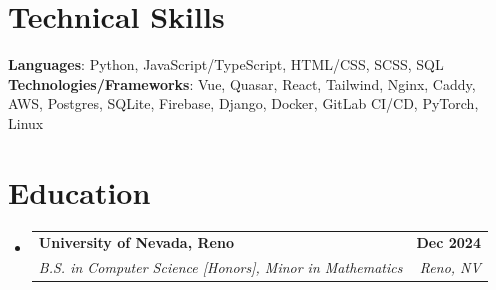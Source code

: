 \documentclass[letterpaper,11pt]{article}
\makeatletter
\newcommand{\resumeSubheading}[4]{
  \vspace{-2pt}\item
    \begin{tabular*}{1.0\textwidth}[t]{l@{\extracolsep{\fill}}r}
      \textbf{#1} & \textbf{\small #2} \\
      \textit{\small#3} & \textit{\small #4} \\
    \end{tabular*}\vspace{-7pt}
}
\newcommand{\resumeSubHeadingListStart}{\begin{itemize}[leftmargin=0.0in, label={}]}
\newcommand{\resumeSubHeadingListEnd}{\end{itemize}}
\makeatother
\begin{document}
%
\section{Technical Skills}
 \begin{itemize}[leftmargin=0.15in, label={}]
    \small{\item{
     \textbf{Languages}{: Python, JavaScript/TypeScript, HTML/CSS, SCSS, SQL} \\
     \textbf{Technologies/Frameworks}{: Vue, Quasar, React, Tailwind, Nginx, Caddy, AWS, Postgres, SQLite, Firebase, Django, Docker, GitLab CI/CD, PyTorch, Linux} \\
    }}
 \end{itemize}
 \vspace{-14pt}


\section{Education}
  \resumeSubHeadingListStart
    \resumeSubheading
      {University of Nevada, Reno}{Dec 2024}
      {B.S. in Computer Science [Honors], Minor in Mathematics}{Reno, NV}
  \resumeSubHeadingListEnd
\end{document}
